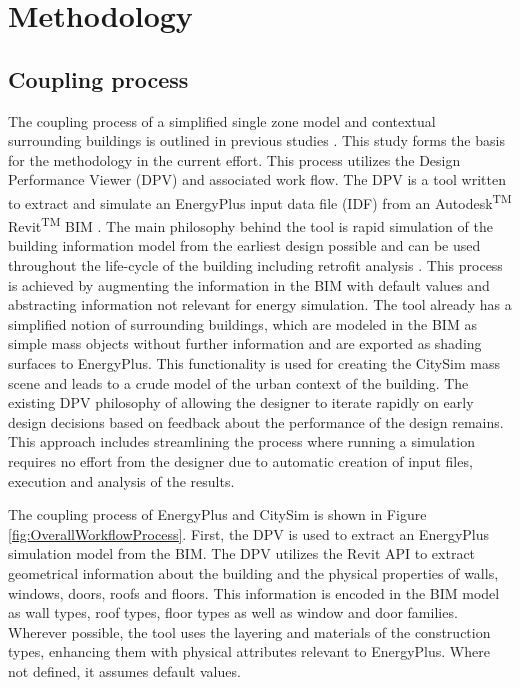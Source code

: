 \documentclass{tBPS2e}
\theoremstyle{plain}
\theoremstyle{definition}
\theoremstyle{remark}
\begin{document}
\section{Methodology}\label{Methodology}

\subsection{Coupling process}
The coupling process of a simplified single zone model and contextual surrounding buildings is outlined in previous studies \citep{thomas2014multiscale,Thomas:2012wj}. This study forms the basis for the methodology in the current effort. This process utilizes the Design Performance Viewer (DPV) and associated work flow. The DPV is a tool written to extract and simulate an EnergyPlus input data file (IDF) from an Autodesk\textsuperscript{TM} Revit\textsuperscript{TM} BIM \citep{Schlueter2009}. The main philosophy behind the tool is rapid simulation of the building information model from the earliest design possible and can be used throughout the life-cycle of the building including retrofit analysis \citep{Miller:2014tu}. This process is achieved by augmenting the information in the BIM with default values and abstracting information not relevant for energy simulation. The tool already has a simplified notion of surrounding buildings, which are modeled in the BIM as simple mass objects without further information and are exported as shading surfaces to EnergyPlus. This functionality is used for creating the CitySim mass scene and leads to a crude model of the urban context of the building. The existing DPV philosophy of allowing the designer to iterate rapidly on early design decisions based on feedback about the performance of the design remains. This approach includes streamlining the process where running a simulation requires no effort from the designer due to automatic creation of input files, execution and analysis of the results.

The coupling process of EnergyPlus and CitySim is shown in Figure \ref{fig:OverallWorkflowProcess}. First, the DPV is used to extract an EnergyPlus simulation model from the BIM. The DPV utilizes the Revit API to extract geometrical information about the building and the physical properties of walls, windows, doors, roofs and floors. This information is encoded in the BIM model as wall types, roof types, floor types as well as window and door families. Wherever possible, the tool uses the layering and materials of the construction types, enhancing them with physical attributes relevant to EnergyPlus. Where not defined, it assumes default values. 
\end{document}
